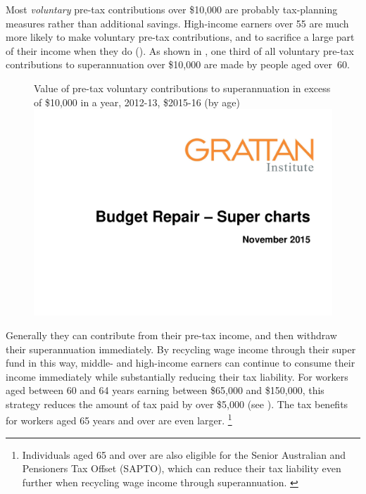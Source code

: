 Most \emph{voluntary} pre-tax contributions over \$10,000 are probably tax-planning measures rather than additional savings. High-income earners over 55 are much more likely to make voluntary pre-tax contributions, and to sacrifice a large part of their income when they do (). As shown in , one third of all voluntary pre-tax contributions to superannuation over \$10,000 are made by people aged over~60. 

\begin{figure}
%
{Value of pre-tax voluntary contributions to superannuation in excess of \$10,000 in a year, 2012-13, \$2015-16 (by age)}
\includegraphics[width=\columnwidth,page=25]{super-atlas/PPTX.pdf}
\end{figure}


Generally they can contribute from their pre-tax income, and then withdraw their superannuation immediately. By recycling wage income through their super fund in this way, middle- and high-income earners can continue to consume their income immediately while substantially reducing their tax liability. For workers aged between 60 and 64 years earning between \$65,000 and \$150,000, this strategy reduces the amount of tax paid by over \$5,000 (see ). The tax benefits for workers aged 65 years and over are even larger.%
\footnote{Individuals aged 65 and over are also eligible for the Senior Australian and Pensioners Tax Offset (SAPTO), which can reduce their tax liability even further when recycling wage income through superannuation. \textcite{ATO2015-Beneficiary-tax-offset-sapto-calculator}} 

